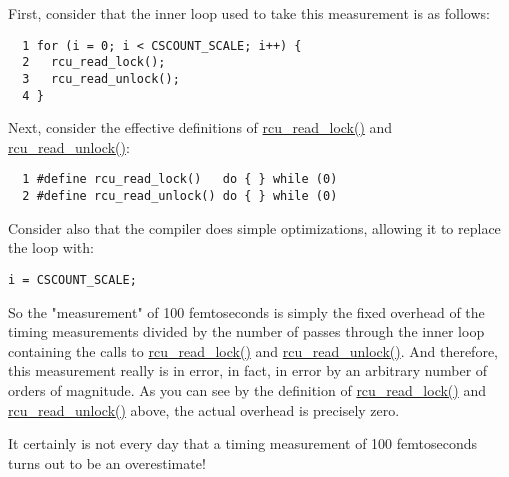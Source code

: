 First, consider that the inner loop used to
take this measurement is as follows:

\vspace{5pt}
\begin{minipage}[t]{\columnwidth}
\small
\begin{verbatim}
  1 for (i = 0; i < CSCOUNT_SCALE; i++) {
  2   rcu_read_lock();
  3   rcu_read_unlock();
  4 }
\end{verbatim}
\end{minipage}
\vspace{5pt}

Next, consider the effective definitions of \url{rcu_read_lock()}
and \url{rcu_read_unlock()}:

\vspace{5pt}
\begin{minipage}[t]{\columnwidth}
\small
\begin{verbatim}
  1 #define rcu_read_lock()   do { } while (0)
  2 #define rcu_read_unlock() do { } while (0)
\end{verbatim}
\end{minipage}
\vspace{5pt}

Consider also that the compiler does simple optimizations,
allowing it to replace the loop with:

\vspace{5pt}
\begin{minipage}[t]{\columnwidth}
\small
\begin{verbatim}
i = CSCOUNT_SCALE;
\end{verbatim}
\end{minipage}
\vspace{5pt}

So the "measurement" of 100 femtoseconds is simply the fixed
overhead of the timing measurements divided by the number of
passes through the inner loop containing the calls
to \url{rcu_read_lock()} and \url{rcu_read_unlock()}.
And therefore, this measurement really is in error, in fact,
in error by an arbitrary number of orders of magnitude.
As you can see by the definition of \url{rcu_read_lock()}
and \url{rcu_read_unlock()} above, the actual overhead
is precisely zero.

It certainly is not every day that a timing measurement of
100 femtoseconds turns out to be an overestimate!


